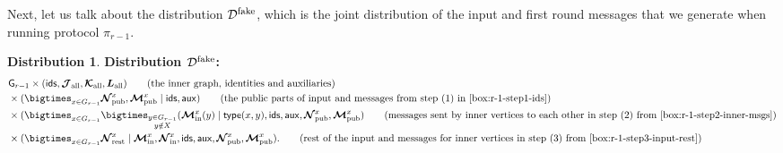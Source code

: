 \documentclass[11pt]{article}
\theoremstyle{definition}
\newtheorem{mddistribution}{Distribution}
\newenvironment{Distribution}{\begin{tbox}\begin{mddistribution}}{\end{mddistribution}\end{tbox}}
\newenvironment{tbox}{\begin{tcolorbox}[
		enlarge top by=5pt,
		enlarge bottom by=5pt,
		 breakable,
		 boxsep=0pt,
                  left=4pt,
                  right=4pt,
                  top=10pt,
                  arc=4pt,
                  boxrule=1pt,toprule=1pt,
                  colback=white
                  ]%
	}
{\end{tcolorbox}}
\newcommand{\rv}[1]{\ensuremath{{\mathsf{#1}}}\xspace}
\newcounter{mybox}
\renewcommand{\themybox}{\arabic{mybox}}
\newcommand{\namethebox}{\begin{center}\textbf{Box~\themybox} \end{center}}
\newcommand{\prot}{\ensuremath{\pi}}
\newcommand{\rtypeval}[1]{\ensuremath{\rv{type}(#1)}}
\newcommand{\rNinner}[2]{\ensuremath{\bm{\mathcal{N}}_{\textnormal{in}}^{#1_{#2}}}}
\newcommand{\cD}{\ensuremath{\mathcal{D}}}
\newcommand{\cDfake}{\ensuremath{\cD^{\textnormal{fake}}}}
\newcommand{\raux}{\ensuremath{\rv{aux}}}
\newcommand{\rcJall}{\ensuremath{\bm{\mathcal{J}}_{\textnormal{all}}}}
\newcommand{\rcKall}{\ensuremath{\bm{\mathcal{K}}_{\textnormal{all}}}}
\newcommand{\rLall}{\ensuremath{\bm{L}_{\textnormal{all}}}}
\newcommand{\rNpub}[1]{\ensuremath{\bm{\mathcal{N}}_{\textnormal{pub}}^{#1}}}
\newcommand{\rMpub}[1]{\ensuremath{\bm{\mathcal{M}}_{\textnormal{pub}}^{#1}}}
\newcommand{\rMinner}[1]{\ensuremath{\bm{\mathcal{M}}_{\textnormal{in}}^{#1}}}
\newcommand{\rNrest}[1]{\ensuremath{\bm{\mathcal{N}}^{#1}_{\textnormal{rest}}}}
\newcommand{\rG}{\ensuremath{\rv{G}}}
\newcommand{\rids}{\ensuremath{\rv{ids}}}
\begin{document}
Next, let us talk about the distribution $\cDfake$, which is the joint distribution of the input and first round messages that we generate when running protocol $\prot_{r-1}$. 
\begin{Distribution}\label{box:cDfake}
\textbf{Distribution $\cDfake$:}
\begin{align*}
	&\rG_{r-1} \times (\rids, \rcJall, \rcKall, \rLall) \tag{the inner graph, identities and auxiliaries}\\
	&\times (\bigtimes_{x \in G_{r-1}} \rNpub{x}, \rMpub{x} \mid \rids, \raux) \tag{the public parts of input and messages from step (1) in \Cref{box:r-1-step1-ids}} \\
	&\times (\bigtimes_{x \in G_{r-1}} \bigtimes_{\substack{y  \in G_{r-1} \\ y \notin X}} (\rMinner{x}(y) \mid  \rtypeval{x, y}, \rids, \raux, \rNpub{x}, \rMpub{x})   \tag{messages sent by inner vertices to each other in step (2) from \Cref{box:r-1-step2-inner-msgs}} \\
	&\times (\bigtimes_{x \in G_{r-1}}  \rNrest{x} \mid \rMinner{x}, \rNinner{x}{}, \rids, \raux, \rNpub{x}, \rMpub{x}). \tag{rest of the input and messages for inner vertices in step (3) from \Cref{box:r-1-step3-input-rest}}
\end{align*}
\end{Distribution}
\end{document}
